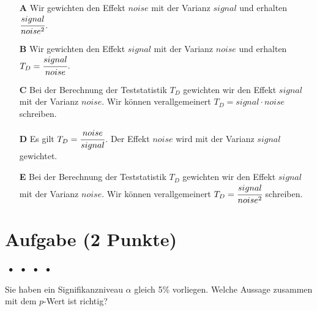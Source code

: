 \documentclass[a4paper, 9pt]{scrartcl}\usepackage[]{graphicx}\usepackage[]{xcolor}
\begin{document}
\begin{enumerate}
\item [\textbf{A} \msquare] Wir gewichten den Effekt $noise$ mit der Varianz $signal$ und erhalten $\cfrac{signal}{noise^2}$.
\item [\textbf{B} \msquare] Wir gewichten den Effekt $signal$ mit der Varianz $noise$ und erhalten $T_D = \cfrac{signal}{noise}$.
\item [\textbf{C} \msquare] Bei der Berechnung der Teststatistik $T_D$ gewichten wir den Effekt $signal$ mit der Varianz $noise$. Wir können verallgemeinert $T_D = signal \cdot noise$ schreiben.
\item [\textbf{D} \msquare] Es gilt $T_D = \cfrac{noise}{signal}$. Der Effekt $noise$ wird mit der Varianz $signal$ gewichtet.
\item [\textbf{E} \msquare] Bei der Berechnung der Teststatistik $T_D$ gewichten wir den Effekt $signal$ mit der Varianz $noise$. Wir können verallgemeinert $T_D = \cfrac{signal}{noise^2}$ schreiben.
\end{enumerate}


\section{Aufgabe \hfill (2 Punkte)}

\ifcollection
\begin{flushright}
\tiny\vspace{-2Ex}
\textbf{\examinhaltstart}
\exammodulemathstat $\;\bullet$
\exammodulestat $\;\bullet$
\exammodulestatbbv $\;\bullet$
\exammodulestatversuch $\;\bullet$
\exammodulebiostat
\vspace{-1Ex}
\end{flushright}
\fi




Sie haben ein Signifikanzniveau $\alpha$ gleich 5\% vorliegen. Welche Aussage zusammen mit dem $p$-Wert ist richtig?
\end{document}
